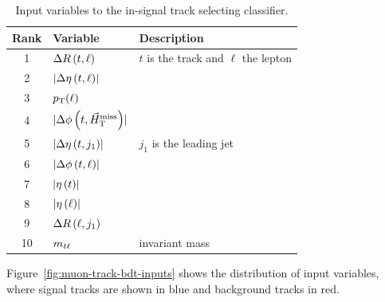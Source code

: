 \begin{table}[!htb]
	\centering
	\label{tab:track-bdt-variables}
		\caption{Input variables to the in-signal track selecting classifier.}
			\begin{tabular}{cll} \hline
			Rank & Variable & Description \\ \hline
			1 & $\Delta R\left(t, \ell\right)$ & $t$ is the track and $\ell$ the lepton\\
			2 & $\lvert \Delta \eta \left(t, \ell\right)  \rvert$ & \\
			3 & $p_{\mathrm{T}}(\ell)$ & \\
			
			4 & $\lvert \Delta\phi\left(t, \vec{H}_{\text{T}}^{\text{miss}} \right) \rvert$ & \\
			5 & $\lvert \Delta\eta\left(t, j_1 \right) \rvert$ & $j_1$ is the leading jet\\
			6 & $\lvert \Delta\phi\left(t, \ell \right) \rvert$ & \\
			7 & $\lvert \eta\left(t\right) \rvert$ & \\
			8 & $\lvert \eta\left(\ell\right) \rvert$ & \\
			9 & $\Delta R\left(\ell, j_1\right)$ & \\
			10 & $m_{t\ell}$ & invariant mass \\ 
			\hline
			\end{tabular}
\end{table}

Figure~\ref{fig:muon-track-bdt-inputs} shows the distribution of input variables, where signal tracks are shown in blue and background tracks in red.

